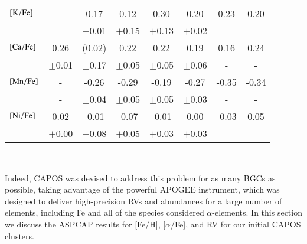 \documentclass[onecolumn]{aa}
\begin{document}
\begin{table*}
\begin{center}
\begin{tabular}{ l c  c c  c  c c  c   }
${\rm [K/Fe]}$    & -       	  &  0.17      	    &  0.12          &    0.30       	 &  0.20       	   &   0.23          &   0.20         \\
& -  	  &  $\pm$0.01 	    &  $\pm$0.15     &    $\pm$0.13  	 &  $\pm$0.02  	   &   -     &   -    \\
${\rm [Ca/Fe]}$   & 0.26       	  &  (0.02)      	    &  0.22          &    0.22       	 &  0.19       	   &   0.16          &   0.24         \\
& $\pm$0.01  	  &  $\pm$0.17 	    &  $\pm$0.05     &    $\pm$0.05  	 &  $\pm$0.06  	   &   -     &   -    \\	  
${\rm [Mn/Fe]}$   & -      	  &  -0.26     	    &  -0.29         &    -0.19      	 &  -0.27      	   &   -0.35         &   -0.34        \\
& -  	  &  $\pm$0.04 	    &  $\pm$0.05     &    $\pm$0.05  	 &  $\pm$0.03  	   &   -     &   -    \\
${\rm [Ni/Fe]}$   & 0.02       	  &  -0.01     	    &  -0.07         &    -0.01      	 &  0.00       	   &   -0.03          &   0.05         \\
& $\pm$0.00  	  &  $\pm$0.08 	    &  $\pm$0.05     &    $\pm$0.03  	 &  $\pm$0.03  	   &   -     &  -    \\
\hline
		\end{tabular}  \label{Element}\\
	\end{center}
	\raggedright{}
\end{table*}

Indeed, CAPOS was devised to address this problem for as many BGCs as possible, taking advantage of the powerful APOGEE instrument, which was designed to deliver high-precision RVs and abundances for a large number of elements, including Fe and all of the species considered $\alpha$-elements. In this section we discuss the ASPCAP results for [Fe/H], [$\alpha$/Fe], and RV for our initial CAPOS clusters. 
\end{document}
